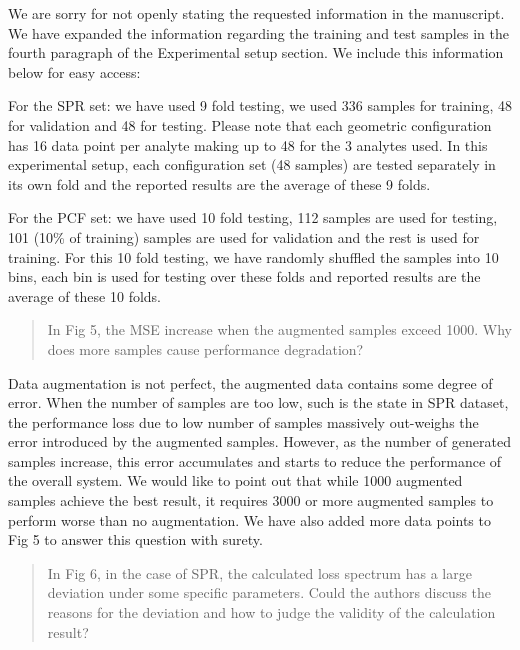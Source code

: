 \documentclass{article}
\begin{document}
	We are sorry for not openly stating the requested information in the manuscript. We have expanded the information regarding the training and test samples in the fourth paragraph of the Experimental setup section. We include this information below for easy access:
	
	For the SPR set: we have used 9 fold testing, we used 336 samples for training, 48 for validation and 48 for testing. Please note that each geometric configuration has 16 data point per analyte making up to 48 for the 3 analytes used. In this experimental setup, each configuration set (48 samples) are tested separately in its own fold and the reported results are the average of these 9 folds.
	
	For the PCF set: we have used 10 fold testing, 112 samples are used for testing, 101 (10\% of training) samples are used for validation and the rest is used for training. For this 10 fold testing, we have randomly shuffled the samples into 10 bins, each bin is used for testing over these folds and reported results are the average of these 10 folds.
	
	\begin{quote}
	In Fig 5, the MSE increase when the augmented samples exceed 1000. Why does more samples cause performance degradation?
	\end{quote}
	
	Data augmentation is not perfect, the augmented data contains some degree of error. When the number of samples are too low, such is the state in SPR dataset, the performance loss due to low number of samples massively out-weighs the error introduced by the augmented samples. However, as the number of generated samples increase, this error accumulates and starts to reduce the performance of the overall system. We would like to point out that while 1000 augmented samples achieve the best result, it requires 3000 or more augmented samples to perform worse than no augmentation. We have also added more data points to Fig 5 to answer this question with surety.
	
	
	\begin{quote}
	In Fig 6, in the case of SPR, the calculated loss spectrum has a large deviation under some specific parameters. Could the authors discuss the reasons for the deviation and how to judge the validity of the calculation result?
	\end{quote}
	
\end{document}
